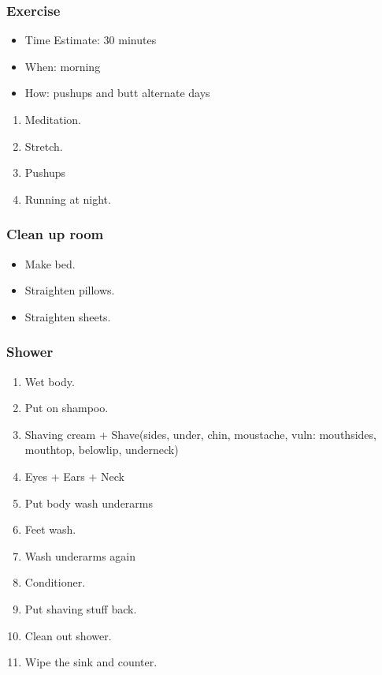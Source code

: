 \begin{frame}[label=exercise] 
\frametitle{Exercise}
\begin{itemize} 
\tiny \item \tiny Time Estimate: 30 minutes  
\item \tiny When: morning 
 \item \tiny How: pushups and butt alternate days 
\end{itemize}

\begin{enumerate} 
\small \item \small Meditation. 
 \item \small Stretch. 
\item \small Pushups 
\item \small Running at night. 
\end{enumerate} 
\end{frame}

\begin{frame} 
\frametitle{Clean up room}
\begin{itemize}
\small \item \small Make bed. 
\item \small Straighten pillows.  
\item \small Straighten sheets. 
\end{itemize} 
\end{frame}

\begin{frame}[label=shower] 
\frametitle{Shower} 
\begin{enumerate} 
\small \item \small Wet body. 
\small \item \small Put on shampoo.
\item \small Shaving cream + Shave(sides, under, chin, moustache, vuln: mouthsides, mouthtop, belowlip, underneck) 
\item \small Eyes + Ears + Neck 
\item \small Put body wash underarms 
\item \small Feet wash. 
\item \small Wash underarms again 
\item \small Conditioner. 
\item \small Put shaving stuff back. 
\item \small Clean out shower. 
\item \small Wipe the sink and counter. 
\end{enumerate} 
\end{frame} 

